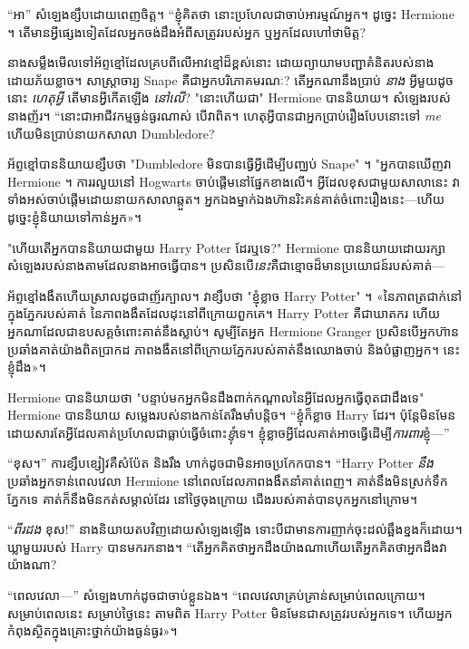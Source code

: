 {{{{{{“អា” សំឡេងខ្សឹបដោយពេញចិត្ត។ “ខ្ញុំគិតថា នោះប្រហែលជាចាប់អារម្មណ៍អ្នក។ ដូច្នេះ Hermione ។ តើមានអ្វីផ្សេងទៀតដែលអ្នកចង់ដឹងអំពីសត្រូវរបស់អ្នក ឬអ្នកដែលហៅថាមិត្ត?

នាងសម្លឹងមើលទៅអ័ព្ទខ្មៅដែលគ្របពីលើអាវខ្មៅដ៏ខ្ពស់នោះ ដោយព្យាយាមបញ្ជាគំនិតរបស់នាងដោយភ័យខ្លាច។ សាស្រ្តាចារ្យ Snape គឺជាអ្នកបរិភោគមរណៈ? តើអ្នកណានឹងប្រាប់ \emph{នាង} អ្វីមួយដូចនោះ \emph{ហេតុអ្វី} តើមានអ្វីកើតឡើង \emph{នៅលើ}? "នោះហើយជា" Hermione បាននិយាយ។ សំឡេងរបស់នាងញ័រ។ “នោះ​ជា​អាជីវកម្ម​ធ្ងន់ធ្ងរ​ណាស់ បើ​វា​ពិត។ ហេតុ​អ្វី​បាន​ជា​អ្នក​ប្រាប់​រឿង​បែប​នោះ​ទៅ \emph{me} ហើយ​មិន​ប្រាប់​នាយក​សាលា Dumbledore?

អ័ព្ទខ្មៅបាននិយាយខ្សឹបថា "Dumbledore មិនបានធ្វើអ្វីដើម្បីបញ្ឈប់ Snape" ។ "អ្នកបានឃើញវា Hermione ។ ការរលួយនៅ Hogwarts ចាប់ផ្តើមនៅផ្នែកខាងលើ។ អ្វី​ដែល​ខុស​ជាមួយ​សាលា​នេះ វា​ទាំង​អស់​ចាប់​ផ្ដើម​ដោយ​នាយក​សាលា​ឆ្កួត។ អ្នក​ឯង​ម្នាក់​ឯង​ហ៊ាន​រិះគន់​គាត់​ចំពោះ​រឿង​នេះ—ហើយ​ដូច្នេះ​ខ្ញុំ​និយាយ​ទៅ​កាន់​អ្នក»។

"ហើយតើអ្នកបាននិយាយជាមួយ Harry Potter ដែរឬទេ?" Hermione បាននិយាយដោយរក្សាសំឡេងរបស់នាងតាមដែលនាងអាចធ្វើបាន។ ប្រសិនបើ\emph{នេះ}គឺជាខ្មោចដ៏មានប្រយោជន៍របស់គាត់—

អ័ព្ទ​ខ្មៅ​ងងឹត​ហើយ​ស្រាល​ដូច​ជា​ញ័រ​ក្បាល។ វាខ្សឹបថា "ខ្ញុំខ្លាច Harry Potter" ។ «នៃភាពត្រជាក់នៅក្នុងភ្នែករបស់គាត់ នៃភាពងងឹតដែលដុះនៅពីក្រោយពួកគេ។ Harry Potter គឺជាឃាតករ ហើយអ្នកណាដែលជាឧបសគ្គចំពោះគាត់នឹងស្លាប់។ សូម្បីតែអ្នក Hermione Granger ប្រសិនបើអ្នកហ៊ានប្រឆាំងគាត់យ៉ាងពិតប្រាកដ ភាពងងឹតនៅពីក្រោយភ្នែករបស់គាត់នឹងឈោងចាប់ និងបំផ្លាញអ្នក។ នេះ​ខ្ញុំ​ដឹង»។

Hermione បាននិយាយថា "បន្ទាប់មកអ្នកមិនដឹងពាក់កណ្តាលនៃអ្វីដែលអ្នកធ្វើពុតជាដឹងទេ" Hermione បាននិយាយ សម្លេងរបស់នាងកាន់តែរឹងមាំបន្តិច។ “ខ្ញុំក៏ខ្លាច Harry ដែរ។ ប៉ុន្តែមិនមែនដោយសារតែអ្វីដែលគាត់ប្រហែលជាធ្លាប់ធ្វើចំពោះ\emph{ខ្ញុំ}ទេ។ ខ្ញុំខ្លាចអ្វីដែលគាត់អាចធ្វើដើម្បី\emph{ការពារ}ខ្ញុំ—”

“ខុស។” ការខ្សឹបខ្សៀវគឺសំប៉ែត និងរឹង ហាក់ដូចជាមិនអាចប្រកែកបាន។ “Harry Potter \emph{នឹង} ប្រឆាំងអ្នកទាន់ពេលវេលា Hermione នៅពេលដែលភាពងងឹតនាំគាត់ពេញ។ គាត់នឹងមិនស្រក់ទឹកភ្នែកទេ គាត់ក៏នឹងមិនកត់សម្គាល់ដែរ នៅថ្ងៃចុងក្រោយ ជើងរបស់គាត់បានបុកអ្នកនៅក្រោម។

“\emph{ពីរដង} ខុស!” នាង​និយាយ​តប​វិញ​ដោយ​សំឡេង​ឡើង ទោះ​បី​ជា​មាន​ការ​ញាក់​ចុះ​ដល់​ឆ្អឹងខ្នង​ក៏​ដោយ។ ឃ្លាមួយរបស់ Harry បានមករកនាង។ “តើ​អ្នក​គិត​ថា​អ្នក​ដឹង​យ៉ាង​ណា​ហើយ​តើ​អ្នក​គិត​ថា​អ្នក​ដឹង​វា​យ៉ាង​ណា?

“ពេលវេលា—” សំឡេងហាក់ដូចជាចាប់ខ្លួនឯង។ “ពេលវេលាគ្រប់គ្រាន់សម្រាប់ពេលក្រោយ។ សម្រាប់ពេលនេះ សម្រាប់ថ្ងៃនេះ តាមពិត Harry Potter មិនមែនជាសត្រូវរបស់អ្នកទេ។ ហើយ​អ្នក​កំពុង​ស្ថិត​ក្នុង​គ្រោះ​ថ្នាក់​យ៉ាង​ធ្ងន់ធ្ងរ​»។

}}}}}}
